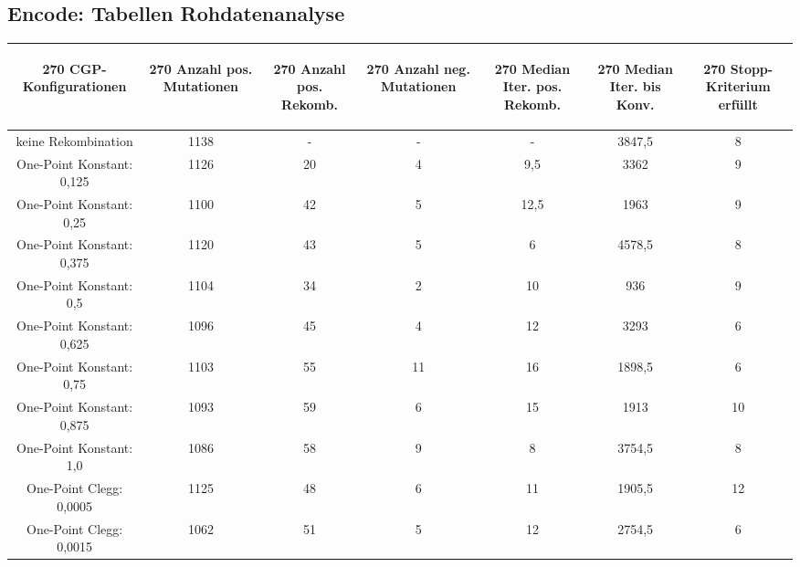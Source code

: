 \subsection{Encode: Tabellen Rohdatenanalyse}
\label{subsec:appendix:TabellenReohdatenanalyseEncode}
 \begin{table}[H]
	\centering
	\begin{tabular}{c | c | c | c | c | c | c}
		\begin{turn}{270} \textbf{CGP-Konfigurationen} \end{turn} & \begin{turn}{270} \textbf{Anzahl pos. Mutationen} \end{turn} & \begin{turn}{270} \textbf{Anzahl pos. Rekomb.} \end{turn} & \begin{turn}{270} \textbf{Anzahl neg. Mutationen} \end{turn} & \begin{turn}{270} \textbf{Median Iter. pos. Rekomb.} \end{turn} & \begin{turn}{270} \textbf{Median Iter. bis Konv.} \end{turn} & \begin{turn}{270} \textbf{Stopp-Kriterium erfüllt} \end{turn}\\
		\hline
		keine Rekombination & 1138 & - & - & - & 3847,5 & 8\\
		\hline
		\hline
		One-Point Konstant: 0,125 & 1126 & 20 & 4 & 9,5 & 3362 & 9\\
		\hline
		One-Point Konstant: 0,25 & 1100 & 42 & 5 & 12,5 & 1963 & 9\\
		\hline
		One-Point Konstant: 0,375 & 1120 & 43 & 5 & 6 & 4578,5 & 8\\
		\hline
		One-Point Konstant: 0,5 & 1104 & 34 & 2 & 10 & 936 & 9\\
		\hline
		One-Point Konstant: 0,625 & 1096 & 45 & 4 & 12 & 3293 & 6\\
		\hline
		One-Point Konstant: 0,75 & 1103 & 55 & 11 & 16 & 1898,5 & 6\\
		\hline
		One-Point Konstant: 0,875 & 1093 & 59 & 6 & 15 & 1913 & 10\\
		\hline
		One-Point Konstant: 1,0 & 1086 & 58 & 9 & 8 & 3754,5 & 8\\
		\hline
		\hline
		One-Point Clegg: 0,0005 & 1125 & 48 & 6 & 11 & 1905,5 & 12\\
		\hline
		One-Point Clegg: 0,0015 & 1062 & 51 & 5 & 12 & 2754,5 & 6\\

\end{tabular}
\end{table}
